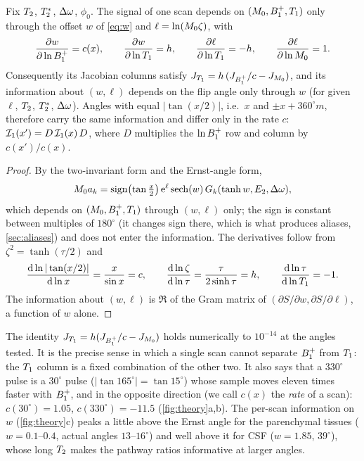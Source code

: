 \begin{proposition}\label{prop:perscan}
Fix $T_2$, $T_2^{*}$, $\Delta\omega$, $\phi_0$. The signal of one scan depends on $(M_0,B_1^{+},T_1)$ only through
the offset $w$ of \eqref{eq:w} and $\ell=\ln(M_0\zeta)$, with
\begin{equation}
  \frac{\partial w}{\partial\ln B_1^{+}}=c(x),\qquad\frac{\partial w}{\partial\ln T_1}=h,\qquad
  \frac{\partial\ell}{\partial\ln T_1}=-h,\qquad\frac{\partial\ell}{\partial\ln M_0}=1 .
  \label{eq:chain}
\end{equation}
Consequently its Jacobian columns satisfy $J_{T_1}=h\,(J_{B_1^{+}}/c-J_{M_0})$, and its information about
$(w,\ell)$ depends on the flip angle only through $w$ (for given $\ell$, $T_2$, $T_2^{*}$, $\Delta\omega$). Angles with equal
$|\tan(x/2)|$, i.e.\ $x$ and $\pm x+360^\circ m$, therefore carry the same information and differ only in the
rate $c$: $\mathcal{I}_1(x')=D\,\mathcal{I}_1(x)\,D$, where $D$ multiplies the $\ln B_1^{+}$ row and column by $c(x')/c(x)$.
\end{proposition}
\begin{proof}
By the two-invariant form and the Ernst-angle form,
\[
  M_0 a_k=\operatorname{sign}\bigl(\tan\tfrac x2\bigr)\,\mathrm{e}^\ell\operatorname{sech}(w)\,G_k(\tanh w,E_2,\Delta\omega),
\]
which depends on $(M_0,B_1^{+},T_1)$ through $(w,\ell)$ only; the sign is constant between multiples
of $180^\circ$ (it changes sign there, which is what produces aliases, \cref{sec:aliases}) and does not
enter the information.
The derivatives follow from $\zeta^2=\tanh(\tau/2)$ and
\[
  \frac{\mathrm d\ln|\tan(x/2)|}{\mathrm d\ln x}=\frac{x}{\sin x}=c,\qquad
  \frac{\mathrm d\ln\zeta}{\mathrm d\ln\tau}=\frac{\tau}{2\sinh\tau}=h,\qquad
  \frac{\mathrm d\ln\tau}{\mathrm d\ln T_1}=-1 .
\] The information about $(w,\ell)$ is $\Re$ of the Gram matrix of
$(\partial S/\partial w,\partial S/\partial\ell)$, a function of $w$ alone.
\end{proof}

The identity $J_{T_1}=h(J_{B_1^{+}}/c-J_{M_0})$ holds numerically to $10^{-14}$ at the angles tested. It is the
precise sense in which a single scan cannot separate $B_1^{+}$ from $T_1$: the $T_1$ column is a fixed
combination of the other two. It also says that a $330^\circ$ pulse is a $30^\circ$ pulse ($|\tan165^\circ|=
\tan15^\circ$) whose sample moves eleven times faster with $B_1^{+}$, and in the opposite direction (we call
$c(x)$ the \emph{rate} of a scan):
$c(30^\circ)=1.05$, $c(330^\circ)=-11.5$ (\cref{fig:theory}a,b). The per-scan information on $w$
(\cref{fig:theory}c) peaks a little above the Ernst angle for the parenchymal tissues
($w=0.1$--$0.4$, actual angles $13$--$16^\circ$) and well above it for CSF ($w=1.85$, $39^\circ$), whose long $T_2$
makes the pathway ratios informative at larger angles.

